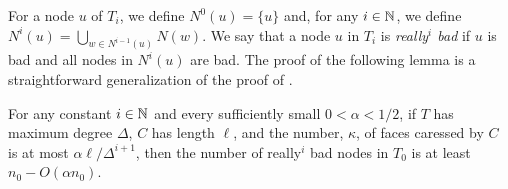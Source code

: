 \documentclass[a4paper,UKenglish]{socg-lipics-v2019}
\begin{document}
%

For a node $u$ of $T_i$, we define $N^0(u) = \{u\}$ and, for any $i\in\mathbb{N}$,
we define $N^{i}(u)=\bigcup_{w\in N^{i-1}(u)} N(w)$.   We say that a node
$u$ in $T_i$ is \emph{really$^{i}$ bad} if $u$ is bad and all nodes in
$N^i(u)$ are bad.  The proof of the following lemma is a straightforward
generalization of the proof of .

\begin{lem}
  For any constant $i\in\mathbb{N}$ and every sufficiently small $0<\alpha < 1/2$,  
  if $T$ has maximum degree $\Delta$, $C$ has length $\ell$, and the number,
  $\kappa$, of faces caressed by $C$ is at most $\alpha\ell/\Delta^{i+1}$, then
  the number of really$^i$ bad nodes in $T_0$ is at least $n_0-O(\alpha n_0)$.
\end{lem}
\end{document}
